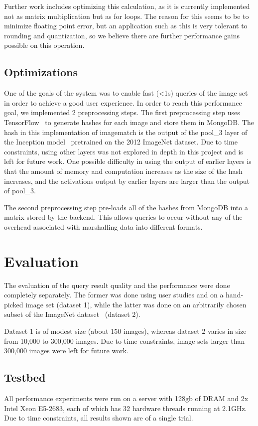 Further work includes optimizing this calculation, as it is currently implemented not as matrix multiplication
but as for loops.
The reason for this seems to be to minimize floating point error, but an application such as this is very
tolerant to rounding and quantization, so we believe there are further performance gains possible on this
operation.

\subsection{Optimizations}
\label{sec:optimizations}
One of the goals of the system was to enable fast (<1s) queries of the image set in order to achieve
a good user experience.
In order to reach this performance goal, we implemented 2 preprocessing steps.
The first preprocessing step uses TensorFlow~\cite{abadi2016tensorflow} to generate hashes for each image and
store them in MongoDB.
The hash in this implementation of imagematch is the output of the pool\_3 layer of the Inception
model~\cite{szegedy2015going} pretrained on the 2012 ImageNet dataset.
Due to time constraints, using other layers was not explored in depth in this project and is left for
future work.
One possible difficulty in using the output of earlier layers is that the amount of memory and computation
increases as the size of the hash increases, and the activations output by earlier layers are larger than
the output of pool\_3.

The second preprocessing step pre-loads all of the hashes from MongoDB into a matrix stored by the backend.
This allows queries to occur without any of the overhead associated with marshalling data into different formats.

\section{Evaluation}
\label{sec:eval}
The evaluation of the query result quality and the performance were done completely separately.
The former was done using user studies and on a hand-picked image set (dataset 1), while the latter was done
on an arbitrarily chosen subset of the ImageNet dataset~\cite{krizhevsky2012imagenet} (dataset 2).

Dataset 1 is of modest size (about 150 images), whereas dataset 2 varies in size from 10,000 to 300,000 images.
Due to time constraints, image sets larger than 300,000 images were left for future work.

\subsection{Testbed}
All performance experiments were run on a server with 128gb of DRAM and 2x Intel Xeon E5-2683, each of which has 32 hardware threads running at 2.1GHz.
Due to time constraints, all results shown are of a single trial.

